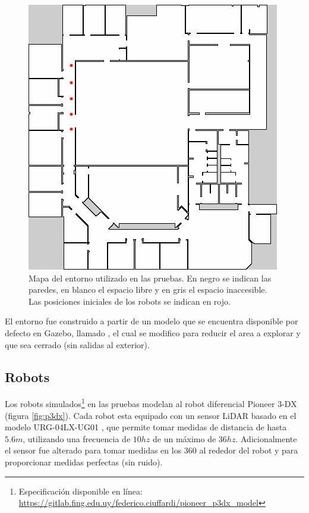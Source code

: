 \begin{figure}[H]
  \center
  \includegraphics[width=0.5\linewidth]{imagenes/willow/0_250000mRobots2.png}
  \caption[Mapa del entorno utilizado en las pruebas.]{Mapa del entorno utilizado en las pruebas. En negro se indican las paredes, en blanco el espacio libre y en gris el espacio inaccesible. Las posiciones iniciales de los robots se indican en rojo.}
  \label{fig:willow}
\end{figure} 

El entorno fue construido a partir de un modelo que se encuentra disponible por
defecto en Gazebo, llamado , el cual se modifico para
reducir el area a explorar y que sea cerrado (sin salidas al exterior).

\subsection{Robots}
Los robots simulados\footnote{Especificación disponible en línea:\\
\url{https://gitlab.fing.edu.uy/federico.ciuffardi/pioneer_p3dx_model}} en las
pruebas modelan al robot diferencial Pioneer 3-DX \cite{p3dx} (figura
\ref{fig:p3dx}). Cada robot esta equipado con un sensor \gls{LiDAR} basado en el
modelo URG-04LX-UG01 \cite{hokuyo}, que permite tomar medidas de distancia de
hasta $5.6m$, utilizando una frecuencia de $10hz$ de un máximo de $36hz$.
Adicionalmente el sensor fue alterado para tomar medidas en los $360$\textdegree
al rededor del robot y para proporcionar medidas perfectas (sin ruido).

